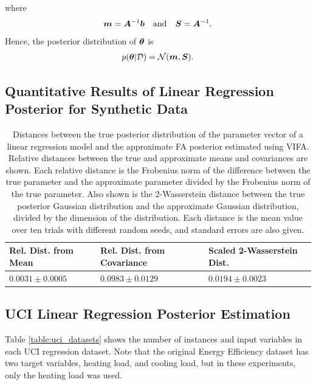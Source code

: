\documentclass[10pt]{article} %
\begin{document}
where
\begin{equation}
	{\bm{m}} = {\bm{A}}^{-1} {\bm{b}}
	\quad \text{and} \quad 
	{\bm{S}} = {\bm{A}}^{-1}.
\end{equation}
Hence, the posterior distribution of ${\bm{\theta}}$ is 
\begin{align}
\begin{split}
	p({\bm{\theta}} | \mathcal{D}) = \mathcal{N}({\bm{m}}, {\bm{S}}).
\end{split}
\end{align}


\subsection{Quantitative Results of Linear Regression Posterior for Synthetic Data}
\label{app:quantitative_results_linear_regression_posterior}

\begin{table}[h!]
\caption{Distances between the true posterior distribution of the parameter vector of a linear regression model and the approximate FA posterior estimated using VIFA. Relative distances between the true and approximate means and covariances are shown. Each relative distance is the Frobenius norm of the difference between the true parameter and the approximate parameter divided by the Frobenius norm of the true parameter. Also shown is the 2-Wasserstein distance between the true posterior Gaussian distribution and the approximate Gaussian distribution, divided by the dimension of the distribution. Each distance is the mean value over ten trials with different random seeds, and standard errors are also given.}
\begin{center}
\begin{tabular}{lll}
\label{table:linear_regression_vi_posterior}
\textbf{Rel. Dist. from Mean} & \textbf{Rel. Dist. from Covariance} & \textbf{Scaled 2-Wasserstein Dist.} \\ \hline
$0.0031 \pm 0.0005$ 	& $0.0983 \pm 0.0129$ 	& $0.0194 \pm 0.0023$ \\ 
\end{tabular}
\end{center}
\end{table}

\subsection{UCI Linear Regression Posterior Estimation}
\label{app:uci_posterior}
Table \ref{table:uci_datasets} shows the number of instances and input variables in each UCI regression dataset. Note that the original Energy Efficiency dataset has two target variables, heating load, and cooling load, but in these experiments, only the heating load was used.
\end{document}
